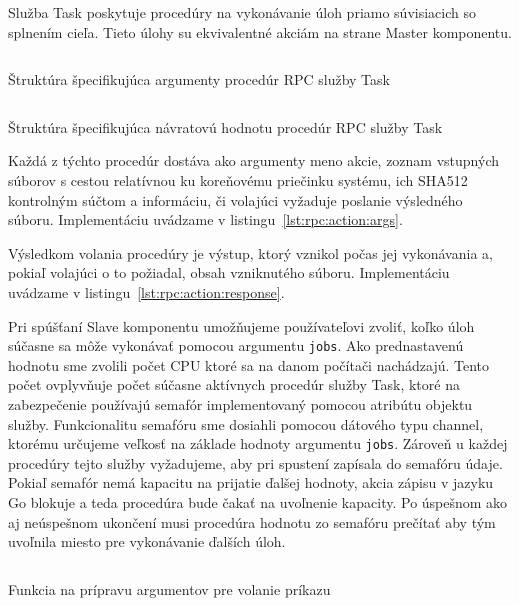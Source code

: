 Služba Task poskytuje procedúry na vykonávanie úloh priamo súvisiacich so
splnením cieľa. Tieto úlohy su ekvivalentné akciám na strane Master komponentu.

\begin{listing}[H]
  \inputminted[frame=lines,framesep=2mm,linenos,fontsize=\scriptsize,firstline=8,lastline=12]{go}{/home/pepol/src/imterra/forge/proto/proto.go}
  \caption[Argumenty služby Task]{Štruktúra špecifikujúca argumenty procedúr RPC služby Task}
  \label{lst:rpc:action:args}
\end{listing}

\begin{listing}[H]
  \inputminted[frame=lines,framesep=2mm,linenos,fontsize=\scriptsize,firstline=14,lastline=17]{go}{/home/pepol/src/imterra/forge/proto/proto.go}
  \caption[Návratová hodnota služby Task]{Štruktúra špecifikujúca návratovú hodnotu procedúr RPC služby Task}
  \label{lst:rpc:action:response}
\end{listing}

Každá z týchto procedúr dostáva ako argumenty meno akcie, zoznam vstupných súborov
s cestou relatívnou ku koreňovému priečinku systému, ich SHA512 kontrolným súčtom a informáciu, či volajúci
vyžaduje poslanie výsledného súboru. Implementáciu uvádzame v listingu~\ref{lst:rpc:action:args}.

Výsledkom volania procedúry je výstup, ktorý vznikol počas jej vykonávania a,
pokiaľ volajúci o to požiadal, obsah vzniknutého súboru. Implementáciu uvádzame
v listingu~\ref{lst:rpc:action:response}.

Pri spúšťaní Slave komponentu umožňujeme používateľovi zvoliť, koľko úloh súčasne sa
môže vykonávať pomocou argumentu \texttt{jobs}. Ako prednastavenú hodnotu sme zvolili počet
CPU ktoré sa na danom počítači nachádzajú. Tento počet ovplyvňuje počet súčasne
aktívnych procedúr služby Task, ktoré na zabezpečenie používajú semafór implementovaný
pomocou atribútu objektu služby. Funkcionalitu semafóru sme dosiahli pomocou
dátového typu channel, ktorému určujeme veľkosť na základe hodnoty argumentu \texttt{jobs}.
Zároveň u každej procedúry tejto služby vyžadujeme, aby pri spustení zapísala do semafóru
údaje. Pokiaľ semafór nemá kapacitu na prijatie ďalšej hodnoty, akcia zápisu v jazyku Go blokuje
a teda procedúra bude čakať na uvoľnenie kapacity. Po úspešnom ako aj neúspešnom ukončení
musi procedúra hodnotu zo semafóru prečítať aby tým uvoľnila miesto pre vykonávanie ďalších
úloh.

\begin{listing}[H]
  \inputminted[frame=lines,framesep=2mm,linenos,fontsize=\scriptsize,firstline=9,lastline=22]{go}{/home/pepol/src/imterra/forge/worker/tasks/util.go}
  \caption{Funkcia na prípravu argumentov pre volanie príkazu}
  \label{lst:rpc:processinputs}
\end{listing}

